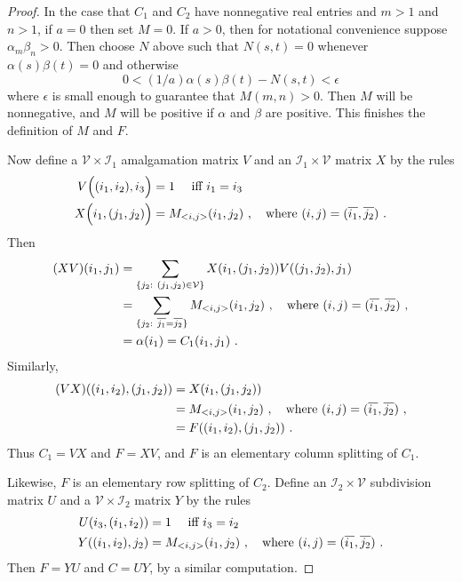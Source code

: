 \documentclass{amsart}
\theoremstyle{definition}
\theoremstyle{remark}
\numberwithin{equation}{section}
\begin{document}
{\begin{proof}
In the case that $C_1$ and $C_2$ have nonnegative real entries and 
$m> 1$ and $n>1$, if $a=0$ then set $M=0$. 
If $a>0$, then for 
notational convenience suppose $\alpha_m\beta_n >0$. 
Then choose $N$ above such that 
$N(s,t) =0$ whenever $\alpha(s)\beta(t)=0$ and otherwise 
\[
0 <  (1/a) \alpha(s)\beta(t)-N(s,t) < \epsilon 
\]
where $\epsilon $ is small enough to guarantee that 
$M(m,n)>0$. Then $M$ will be nonnegative, and $M$ will be positive 
if $\alpha$ and $\beta$ are positive. 
This finishes the definition of $M$ and $F$. 


Now define a $\mathcal V \times \mathcal I_1$
amalgamation matrix $V$ and an 
$\mathcal I_1\times \mathcal V$
matrix $X$ by the rules 
\begin{align*} 
V\Big((i_1,i_2),i_3\Big)& =1 \quad \ \textnormal{iff }i_1=i_3 \\ 
X\Big(i_1,(j_1,j_2)\Big)& = M_{<i,j>}(i_1,j_2) \ , \quad 
\textnormal{where }(i,j)=(\overline{i_1},\overline{j_2})\ .  
\end{align*} 
Then 
\begin{align*} 
(XV)(i_1,j_1) & = 
\sum_{\{j_2:\  (j_1,j_2)\in \mathcal V\}} 
X(i_1,(j_1,j_2))V((j_1,j_2),j_1) \\ 
&=\sum_{
\{j_2: \ \overline{j_1}=\overline{j_2}\}}
M_{<i,j>}(i_1,j_2) 
\ , \quad 
\textnormal{where }(i,j)=(\overline{i_1},
\overline{j_2})\ , 
\\ 
&= \alpha(i_1) = C_1(i_1,j_1) \ . 
\end{align*} 
Similarly, 
\begin{align*}  
(VX)((i_1,i_2),(j_1,j_2)) 
&= X(i_1,(j_1,j_2)) \\ 
&= M_{<i,j>}(i_1,j_2) \ , \quad 
\textnormal{where }(i,j)=(\overline{i_1},\overline{j_2})\ ,   \\ 
&=F((i_1,i_2),(j_1,j_2)) \ . 
\end{align*} 
Thus $C_1=VX$ and $F=XV$, and $F$ is an elementary 
column splitting of $C_1$. 



Likewise, $F$ is an elementary row splitting of $C_2$. Define an $\mathcal I_2 
\times \mathcal V$ subdivision matrix $U$ and a $\mathcal V \times \mathcal I_2$ 
matrix $Y$ by the rules 
\begin{align*}
U(i_3,(i_1,i_2))&= 1 \quad \textnormal{ iff } i_3=i_2 \\ 
Y((i_1,i_2),j_2) &= 
M_{<i,j>}(i_1,j_2) \ , \quad 
\textnormal{where }(i,j)=(\overline{i_1},\overline{j_2})\ . 
\end{align*}
Then $F=YU$ and $C=UY$, by a similar computation. 


\end{proof}}
\end{document}
